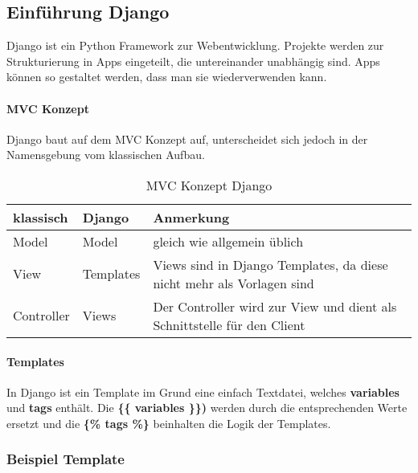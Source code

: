\subsection{Einführung Django}
Django ist ein Python Framework zur Webentwicklung. Projekte werden zur Strukturierung in Apps eingeteilt, die untereinander unabhängig sind. Apps können so gestaltet werden, dass man sie wiederverwenden kann.
\paragraph{MVC Konzept}
Django baut auf dem MVC Konzept auf, unterscheidet sich jedoch in der Namensgebung vom klassischen Aufbau. 
\medskip
\begin{table}[H]
\centering
    \begin{tabular}{|l|l|l|}
    \hline    
    \rowcolor{lightblue}
	klassisch & Django & Anmerkung \\ \hline
	Model & Model & gleich wie allgemein üblich \\ \hline
	View & Templates & Views sind in Django Templates, da diese nicht mehr als Vorlagen sind \\ \hline
	Controller & Views & Der Controller wird zur View und dient als Schnittstelle für den Client \\ \hline
    \end{tabular}
    \caption[MVC Konzept Django]{MVC Konzept Django}
\end{table}

\paragraph{Templates}
In Django ist ein Template im Grund eine einfach Textdatei, welches \textbf{variables} und \textbf{tags} enthält. Die \textbf{\{\{ variables \}\})} werden durch die entsprechenden Werte ersetzt und die \textbf{\{\% tags \%\}} beinhalten die Logik der Templates.

\subsubsection{Beispiel Template}


